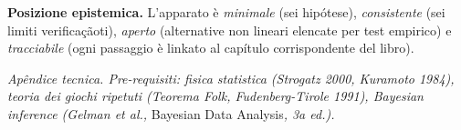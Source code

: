 \Hypoth{} \textbf{Posizione epistemica.} L'apparato è \emph{minimale}
(sei hipótese), \emph{consistente} (sei limiti verificaçãoti), \emph{aperto}
(alternative non lineari elencate per test empirico) e
\emph{tracciabile} (ogni passaggio è linkato al capítulo corrispondente
del libro).



\emph{Apêndice tecnica. Pre-requisiti: fisica statistica (Strogatz
2000, Kuramoto 1984), teoria dei giochi ripetuti (Teorema Folk,
Fudenberg-Tirole 1991), Bayesian inference (Gelman et al., }Bayesian
Data Analysis\emph{, 3a ed.).}
